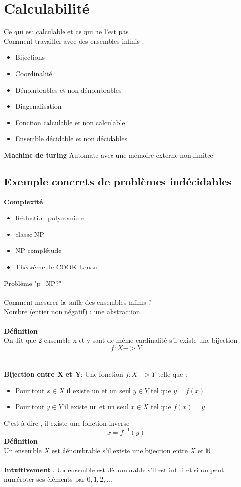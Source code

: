 \documentclass[base.tex]{subfiles}
\begin{document}
\section{Calculabilité}
Ce qui est calculable et ce qui ne l'est pas
\\
Comment travailler avec des ensembles infinis :
\begin{itemize}
\item Bijections
\item Coordinalité
\item Dénombrables et non dénombrables
\item Diagonalisation
\item Fonction calculable et non calculable
\item Ensemble décidable et non décidables
\end{itemize}

\textbf{Machine de turing}
Automate avec une mémoire externe non limitée

\subsection{Exemple concrets de problèmes indécidables}
\textbf{Complexité}
\begin{itemize}
\item Réduction polynomiale
\item classe NP
\item NP complétude
\item Théorème de COOK-Lenon
\end{itemize}
Problème "p=NP?"
\\
\\
Comment mesurer la taille des ensembles infinis ?\\
Nombre (entier non négatif) : une abstraction.
\\
\\
\textbf{Définition}\\
On dit que 2 ensemble x et y sont de même cardinalité s'il existe une bijection
\[f:X->Y\]
\\
\\
\textbf{Bijection entre X et Y}:
Une fonction $f: X -> Y$ telle que :
\begin{itemize}
\item Pour tout $x \in X$ il existe un et un seul $y \in Y$ tel que $y=f(x)$
\item Pour tout $y \in Y$ il existe un et un seul $x \in X$ tel que $f(x) = y$
\end{itemize}
C'est à dire , il existe une fonction inverse \[x = f^{-1}(y)\]
\textbf{Définition}\\
Un ensemble $X$ est dénombrable s'il existe une bijection entre $X$ et $\mathbb{N}$
\\
\\
\textbf{Intuitivement} : Un ensemble est dénombrable s'il est infini et si on peut numéroter ses éléments par $0,1,2,...$
\end{document}
